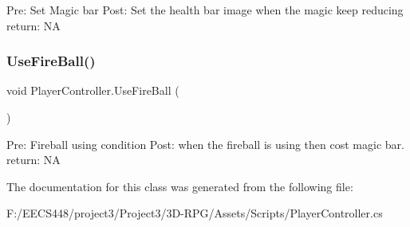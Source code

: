 Pre\+: Set Magic bar Post\+: Set the health bar image when the magic keep reducing return\+: NA \mbox{\label{class_player_controller_af07c0c336328fe5b77c783e49d523bf6}} 
\subsubsection{\texorpdfstring{Use\+Fire\+Ball()}{UseFireBall()}}
{\footnotesize\ttfamily void Player\+Controller.\+Use\+Fire\+Ball (\begin{DoxyParamCaption}{ }\end{DoxyParamCaption})}

Pre\+: Fireball using condition Post\+: when the fireball is using then cost magic bar. return\+: NA 

The documentation for this class was generated from the following file\+:\begin{DoxyCompactItemize}
\item 
F\+:/\+E\+E\+C\+S448/project3/\+Project3/3\+D-\/\+R\+P\+G/\+Assets/\+Scripts/Player\+Controller.\+cs\end{DoxyCompactItemize}
